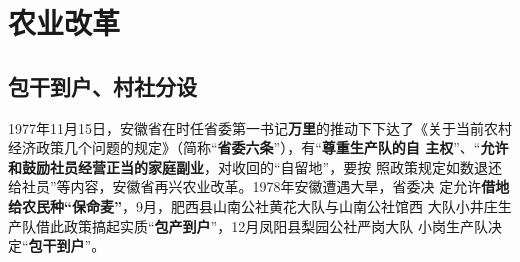 







\section{农业改革}

\subsection{包干到户、村社分设}

1977年11月15日，安徽省在时任省委第一书记\textbf{万里}的推动下下达了《关于当前农村
经济政策几个问题的规定》（简称“\textbf{省委六条}”），有“\textbf{尊重生产队的自
  主权}”、“\textbf{允许和鼓励社员经营正当的家庭副业}，对收回的“自留地”，要按
照政策规定如数退还给社员”等内容，安徽省再兴农业改革。1978年安徽遭遇大旱，省委决
定允许\textbf{借地给农民种“保命麦”}，9月，肥西县山南公社黄花大队与山南公社馆西
大队小井庄生产队借此政策搞起实质“\textbf{包产到户}”，12月凤阳县梨园公社严岗大队
小岗生产队决定“\textbf{包干到户}”。

